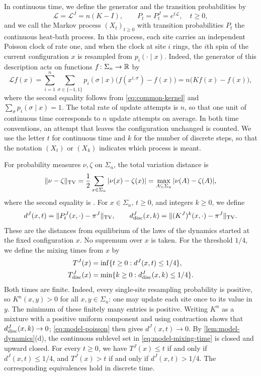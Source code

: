 In continuous time, we define the generator and the transition probabilities by
\begin{equation}\label{eq:common-semigroup}
 \mathcal L=\mathcal L^J=n(K-I),\qquad P_t=P_t^J=e^{t\mathcal L},\quad t\ge0,
\end{equation}
and we call the Markov process $(X_t)_{t\ge0}$ with transition probabilities $P_t$ the continuous heat-bath process. In this process, each site carries an independent Poisson clock of rate one, and when the clock at site $i$ rings, the $i$th spin of the current configuration $x$ is resampled from $p_i(\cdot\mid x)$. Indeed, the generator of this description acts on functions $f\colon\Sigma_n\to\mathbb R$ by
\[
 \mathcal Lf(x)=\sum_{i=1}^n\sum_{\sigma\in\{-1,1\}}p_i(\sigma\mid x)\bigl(f(x^{i,\sigma})-f(x)\bigr)=n\bigl(Kf(x)-f(x)\bigr),
\]
where the second equality follows from \eqref{eq:common-kernel} and $\sum_\sigma p_i(\sigma\mid x)=1$. The total rate of update attempts is $n$, so that one unit of continuous time corresponds to $n$ update attempts on average. In both time conventions, an attempt that leaves the configuration unchanged is counted. We use the letter $t$ for continuous time and $k$ for the number of discrete steps, so that the notation $(X_t)$ or $(X_k)$ indicates which process is meant.

For probability measures $\nu,\zeta$ on $\Sigma_n$, the total variation distance is
\[
 \lVert \nu-\zeta\rVert_{\mathrm{TV}}=\frac12\sum_{x\in\Sigma_n}|\nu(x)-\zeta(x)|=\max_{A\subseteq\Sigma_n}|\nu(A)-\zeta(A)|,
\]
where the second equality is \cite[Proposition~4.2]{levin-peres-2017}. For $x\in\Sigma_n$, $t\ge0$, and integers $k\ge0$, we define
\begin{equation}\label{eq:model-distances}
 d^J(x,t)=\lVert P^J_t(x,\cdot)-\pi^J\rVert_{\mathrm{TV}},\qquad
 d^J_{\rm disc}(x,k)=\lVert (K^J)^k(x,\cdot)-\pi^J\rVert_{\mathrm{TV}}.
\end{equation}
These are the distances from equilibrium of the laws of the dynamics started at the fixed configuration $x$. No supremum over $x$ is taken.
For the threshold $1/4$, we define the mixing times from $x$ by
\begin{equation}\label{eq:model-mixing-time}
 \begin{aligned}
 T^J(x)&=\inf\{t\ge0:d^J(x,t)\le1/4\},\\
 T^J_{\rm disc}(x)&=\min\{k\ge0:d^J_{\rm disc}(x,k)\le1/4\}.
 \end{aligned}
\end{equation}
Both times are finite. Indeed, every single-site resampling probability is
positive, so $K^n(x,y)>0$ for all $x,y\in\Sigma_n$: one may update each site
once to its value in $y$. The minimum of these finitely many entries is
positive. Writing $K^n$ as a mixture with a positive uniform component and
using contraction shows that $d^J_{\rm disc}(x,k)\to0$; \eqref{eq:model-poisson}
then gives $d^J(x,t)\to0$. By \cref{lem:model-dynamics}(d), the continuous
sublevel set in \eqref{eq:model-mixing-time} is closed and upward closed.
For every $t\ge0$, we have $T^J(x)\le t$ if and only if $d^J(x,t)\le1/4$,
and $T^J(x)>t$ if and only if $d^J(x,t)>1/4$.
The corresponding equivalences hold in discrete time.

